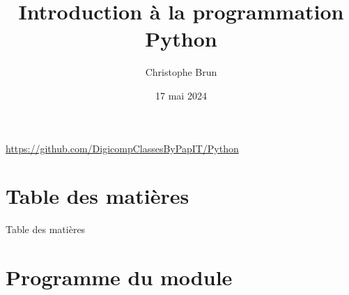 \documentclass{beamer}
\title[PYTHON]{Introduction à la programmation Python}
\author{Christophe Brun}
\institute{Digicomp}
\date{17 mai 2024}
\begin{document}
    \begin{frame}
        \titlepage
        \bigbreak
        \centering
        \url{https://github.com/DigicompClassesByPapIT/Python}
    \end{frame}


    \section{Table des matières}\label{sec:toc}

    \begin{frame}{Table des matières}
        \begin{tiny}
            \begin{multicols}{2}
                \tableofcontents
            \end{multicols}
        \end{tiny}
    \end{frame}


    \section{Programme du module}\label{sec:programme-du-module}
\end{document}
